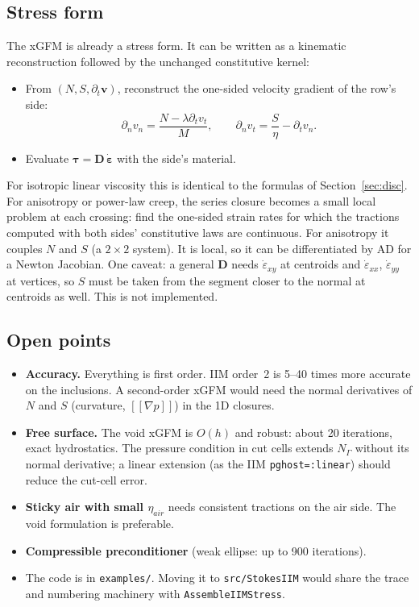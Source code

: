 \documentclass[11pt,a4paper]{article}
\newcommand{\code}[1]{\texttt{#1}}
\newcommand{\jump}[1]{[\![#1]\!]}
\begin{document}
\subsection*{Stress form}

The xGFM is already a stress form. It can be written as a kinematic reconstruction followed by
the unchanged constitutive kernel:
\begin{itemize}
  \item From $(N, S, \partial_t\mathbf v)$, reconstruct the one-sided velocity gradient of the
    row's side:
    \[
    \partial_n v_n=\frac{N-\lambda\partial_tv_t}{M},\qquad
    \partial_n v_t=\frac{S}{\eta}-\partial_t v_n .
    \]
  \item Evaluate $\boldsymbol\tau=\mathbf D\,\dot{\boldsymbol\varepsilon}$ with the side's
    material.
\end{itemize}
For isotropic linear viscosity this is identical to the formulas of Section~\ref{sec:disc}.
For anisotropy or power-law creep, the series closure becomes a small local problem at each
crossing: find the one-sided strain rates for which the tractions computed with both sides'
constitutive laws are continuous. For anisotropy it couples $N$ and $S$ (a $2\times2$ system).
It is local, so it can be differentiated by AD for a Newton Jacobian. One caveat: a general
$\mathbf D$ needs $\dot\varepsilon_{xy}$ at centroids and $\dot\varepsilon_{xx}$,
$\dot\varepsilon_{yy}$ at vertices, so $S$ must be taken from the segment closer to the normal
at centroids as well. This is not implemented.

\subsection*{Open points}
\begin{itemize}
  \item \textbf{Accuracy.} Everything is first order. IIM order~2 is 5--40 times more accurate
    on the inclusions. A second-order xGFM would need the normal derivatives of $N$ and $S$
    (curvature, $\jump{\nabla p}$) in the 1D closures.
  \item \textbf{Free surface.} The void xGFM is $O(h)$ and robust: about 20 iterations,
    exact hydrostatics. The pressure condition in cut cells extends $N_\Gamma$ without its normal
    derivative; a linear extension (as the IIM \code{pghost=:linear}) should reduce the
    cut-cell error.
  \item \textbf{Sticky air with small $\eta_{air}$} needs consistent tractions on the air side.
    The void formulation is preferable.
  \item \textbf{Compressible preconditioner} (weak ellipse: up to 900 iterations).
  \item The code is in \code{examples/}. Moving it to \code{src/StokesIIM} would share the
    trace and numbering machinery with \code{AssembleIIMStress}.
\end{itemize}
\end{document}
